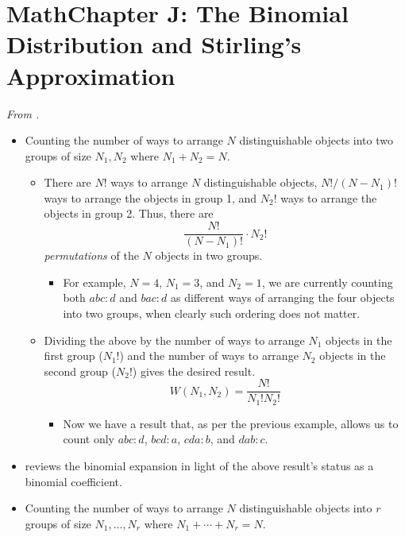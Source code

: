 \documentclass[../notes.tex]{subfiles}
\begin{document}
\section{MathChapter J: The Binomial Distribution and Stirling's Approximation}
\emph{From \textcite{bib:McQuarrieSimon}.}
\begin{itemize}
    \item Counting the number of ways to arrange $N$ distinguishable objects into two groups of size $N_1,N_2$ where $N_1+N_2=N$.
    \begin{itemize}
        \item There are $N!$ ways to arrange $N$ distinguishable objects, $N!/(N-N_1)!$ ways to arrange the objects in group 1, and $N_2!$ ways to arrange the objects in group 2. Thus, there are
        \begin{equation*}
            \frac{N!}{(N-N_1)!}\cdot N_2!
        \end{equation*}
        \emph{permutations} of the $N$ objects in two groups.
        \begin{itemize}
            \item For example, $N=4$, $N_1=3$, and $N_2=1$, we are currently counting both $abc:d$ and $bac:d$ as different ways of arranging the four objects into two groups, when clearly such ordering does not matter.
        \end{itemize}
        \item Dividing the above by the number of ways to arrange $N_1$ objects in the first group ($N_1!$) and the number of ways to arrange $N_2$ objects in the second group ($N_2!$) gives the desired result.
        \begin{equation*}
            W(N_1,N_2) = \frac{N!}{N_1!N_2!}
        \end{equation*}
        \begin{itemize}
            \item Now we have a result that, as per the previous example, allows us to count only $abc:d$, $bcd:a$, $cda:b$, and $dab:c$.
        \end{itemize}
    \end{itemize}
    \item \textcite{bib:McQuarrieSimon} reviews the binomial expansion in light of the above result's status as a binomial coefficient.
    \item Counting the number of ways to arrange $N$ distinguishable objects into $r$ groups of size $N_1,\dots,N_r$ where $N_1+\cdots+N_r=N$.
    \begin{equation*}

\end{equation*}
\end{itemize}
\end{document}

